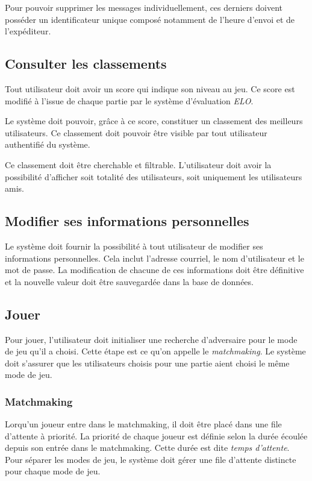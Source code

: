 Pour pouvoir supprimer les messages individuellement, ces
derniers doivent posséder un identificateur unique composé
notamment de l'heure d'envoi et de l'expéditeur.

\subsection{Consulter les classements}

Tout utilisateur doit avoir un score qui indique son niveau
au jeu. Ce score est modifié à l'issue de chaque partie
par le système d'évaluation \emph{ELO}.

Le système doit pouvoir, grâce à ce score, constituer
un classement des meilleurs utilisateurs. Ce classement doit
pouvoir être visible par tout utilisateur authentifié du système.

Ce classement doit être cherchable et filtrable.
L'utilisateur doit avoir la possibilité d'afficher
soit totalité des utilisateurs, soit uniquement les utilisateurs
amis.

\subsection{Modifier ses informations personnelles}

Le système doit fournir la possibilité à tout utilisateur de
modifier ses informations personnelles. Cela inclut
l'adresse courriel, le nom d'utilisateur et le mot de passe.
La modification de chacune de ces informations doit être
définitive et la nouvelle valeur doit être
sauvegardée dans la base de données.

\subsection{Jouer}

Pour jouer, l'utilisateur doit initialiser une recherche
d'adversaire pour le mode de
jeu qu'il a choisi. Cette étape est ce qu'on appelle le
\emph{matchmaking}. Le système doit s'assurer que les
utilisateurs choisis pour une partie aient choisi le même
mode de jeu.

\subsubsection{Matchmaking}

Lorqu'un joueur entre dans le matchmaking, il doit être
placé dans une file d'attente à priorité.
La priorité de chaque joueur est définie selon la durée
écoulée
depuis son entrée dans le matchmaking. Cette durée est dite \emph{temps d'attente}.
Pour séparer les modes de jeu, le système doit gérer une
file d'attente distincte pour chaque mode de jeu.

